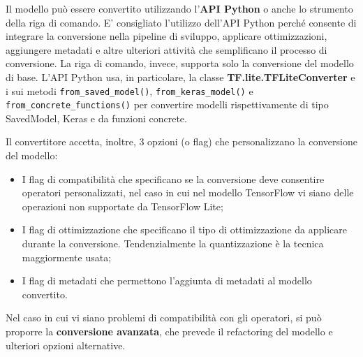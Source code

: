 Il modello può essere convertito utilizzando l’\textbf{API Python} o anche lo strumento della riga di comando. E’ consigliato l’utilizzo dell’API Python perché
consente di integrare la conversione nella pipeline di sviluppo, applicare ottimizzazioni, aggiungere metadati e altre ulteriori attività che
semplificano il processo di conversione. La riga di comando, invece, supporta solo la conversione del modello di base.
L’API Python usa, in particolare, la classe \textbf{TF.lite.TFLiteConverter} e i sui metodi \texttt{from\_saved\_model()}, \texttt{from\_keras\_model()} e \texttt{from\_concrete\_functions()}
per convertire modelli rispettivamente di tipo SavedModel, Keras e da funzioni concrete.

Il convertitore accetta, inoltre, 3 opzioni (o flag) che personalizzano la conversione del modello:
\begin{itemize}
    \item I flag di compatibilità che specificano se la conversione deve consentire operatori personalizzati, nel caso in cui nel modello
    TensorFlow vi siano delle operazioni non supportate da TensorFlow Lite;
    \item I flag di ottimizzazione che specificano il tipo di ottimizzazione da applicare durante la conversione. Tendenzialmente la quantizzazione
    è la tecnica maggiormente usata;
    \item I flag di metadati che permettono l’aggiunta di metadati al modello convertito.
\end{itemize}
Nel caso in cui vi siano problemi di compatibilità con gli operatori, si può proporre la \textbf{conversione avanzata}, che prevede il refactoring del
modello e ulteriori opzioni alternative.

